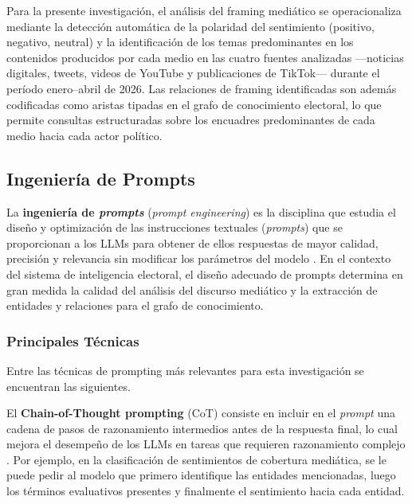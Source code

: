 Para la presente investigación, el análisis del framing mediático se operacionaliza mediante la detección automática de la polaridad del sentimiento (positivo, negativo, neutral) y la identificación de los temas predominantes en los contenidos producidos por cada medio en las cuatro fuentes analizadas —noticias digitales, tweets, videos de YouTube y publicaciones de TikTok— durante el período enero–abril de 2026. Las relaciones de framing identificadas son además codificadas como aristas tipadas en el grafo de conocimiento electoral, lo que permite consultas estructuradas sobre los encuadres predominantes de cada medio hacia cada actor político.

\subsection{Ingeniería de Prompts}

La \textbf{ingeniería de \textit{prompts}} (\textit{prompt engineering}) es la disciplina que estudia el diseño y optimización de las instrucciones textuales (\textit{prompts}) que se proporcionan a los LLMs para obtener de ellos respuestas de mayor calidad, precisión y relevancia sin modificar los parámetros del modelo \parencite{tec_white2023prompt}. En el contexto del sistema de inteligencia electoral, el diseño adecuado de prompts determina en gran medida la calidad del análisis del discurso mediático y la extracción de entidades y relaciones para el grafo de conocimiento.

\subsubsection{Principales Técnicas}

Entre las técnicas de prompting más relevantes para esta investigación se encuentran las siguientes.

El \textbf{Chain-of-Thought prompting} (CoT) consiste en incluir en el \textit{prompt} una cadena de pasos de razonamiento intermedios antes de la respuesta final, lo cual mejora el desempeño de los LLMs en tareas que requieren razonamiento complejo \parencite{tec_wei2022cot}. Por ejemplo, en la clasificación de sentimientos de cobertura mediática, se le puede pedir al modelo que primero identifique las entidades mencionadas, luego los términos evaluativos presentes y finalmente el sentimiento hacia cada entidad.

